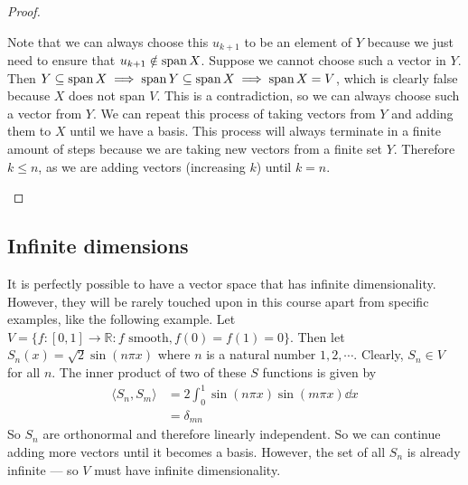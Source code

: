 \begin{proof}
\begin{enumerate}
		      Note that we can always choose this \(u_{k+1}\) to be an element of \(Y\) because we just need to ensure that \(u_{k+1} \notin \operatorname{span} X\).
		      Suppose we cannot choose such a vector in \(Y\).
		      Then \(Y \subseteq \operatorname{span} X \implies \operatorname{span} Y \subseteq \operatorname{span} X \implies \operatorname{span} X = V\), which is clearly false because \(X\) does not span \(V\).
		      This is a contradiction, so we can always choose such a vector from \(Y\).
		      We can repeat this process of taking vectors from \(Y\) and adding them to \(X\) until we have a basis.
		      This process will always terminate in a finite amount of steps because we are taking new vectors from a finite set \(Y\).
		      Therefore \(k \leq n\), as we are adding vectors (increasing \(k\)) until \(k=n\).
	\end{enumerate}
\end{proof}

\subsection{Infinite dimensions}
It is perfectly possible to have a vector space that has infinite dimensionality.
However, they will be rarely touched upon in this course apart from specific examples, like the following example.
Let \(V = \{ f: [0, 1] \to \mathbb R: f \text{ smooth}, f(0) = f(1) = 0\}\).
Then let \(S_n(x) = \sqrt 2 \sin(n \pi x)\) where \(n\) is a natural number \(1, 2, \cdots\).
Clearly, \(S_n \in V\) for all \(n\).
The inner product of two of these \(S\) functions is given by
\begin{align*}
	\langle S_n, S_m \rangle & = 2 \int_0^1 \sin(n \pi x) \sin(m \pi x) \dd{x} \\
	                         & = \delta_{mn}
\end{align*}
So \(S_n\) are orthonormal and therefore linearly independent.
So we can continue adding more vectors until it becomes a basis.
However, the set of all \(S_n\) is already infinite --- so \(V\) must have infinite dimensionality.
